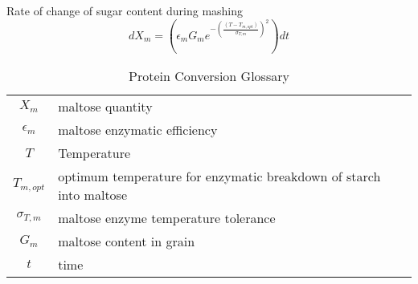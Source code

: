 \documentclass{article}
\newcommand{\BE}{\begin{equation}}
\newcommand{\EE}{\end{equation}}
\begin{document}
Rate of change of sugar content during mashing
\BE dX_m = \left(\epsilon_m G_m e^{-\left(\frac{(T - T_{m,opt})}{\sigma_{T,m}}\right)^2}\right) dt \EE
\begin{table}[H]
\caption{Protein Conversion Glossary}
\begin{center}\begin{tabular}{|c|l|}
\hline
$X_m$ & maltose quantity\\
$\epsilon_m$ & maltose enzymatic efficiency\\
$T$ & Temperature\\
$T_{m,opt}$ & optimum temperature for enzymatic breakdown of starch into maltose\\
$\sigma_{T,m}$ & maltose enzyme temperature tolerance\\
$G_m$ & maltose content in grain\\
$t$ & time\\
\hline
\end{tabular}\end{center}\end{table}
\end{document}
